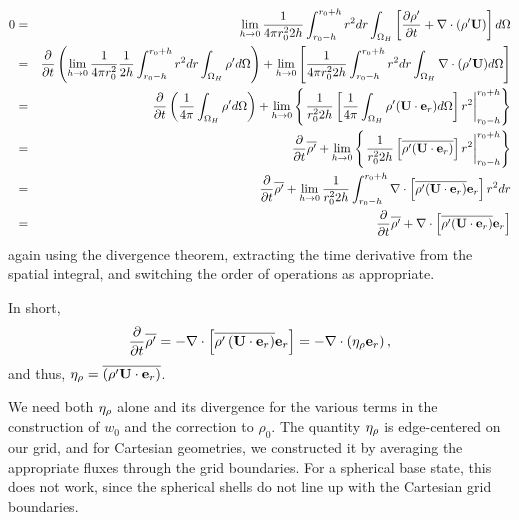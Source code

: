 \begin{eqnarray} 
0 &=& \lim_{h\rightarrow 0} \frac{1}{4\pi r_0^2 2h} \int_{r_0-h}^{r_0+h} r^2  dr \int_{\Omega_H} \left[\frac{\partial \rho'}{\partial t} + \nabla\cdot(\rho'{\bf U})\right] d\Omega \nonumber \\
&=& \frac{\partial}{\partial t} \left( \lim_{h\rightarrow 0} \frac{1}{4\pi r_0^2} \frac{1}{2h} \int_{r_0-h}^{r_0+h} r^2  dr \int_{\Omega_H}  \rho' d\Omega \right) + \lim_{h\rightarrow 0} \left[\frac{1}{4\pi r_0^2  2h} \int_{r_0-h}^{r_0+h} r^2  dr \int_{\Omega_H}  \nabla \cdot ( \rho' {\bf U} )  d\Omega\right] \nonumber \\
&=& \frac{\partial}{\partial t} \left(\frac{1}{4\pi} \int_{\Omega_H}  \rho'  d\Omega \right) + \lim_{h\rightarrow 0} \left\{\left.\frac{1}{r_0^2 2h}\left[\frac{1}{4\pi}\int_{\Omega_H} \rho' ({\bf U} \cdot {\bf e}_r)  d\Omega  \right]  r^2 \right |_{r_0-h}^{r_0+h} \right\} \nonumber  \\
&=&  \frac{\partial}{\partial t} \overline{\rho'} + \lim_{h\rightarrow 0} \left\{ \left .  \frac{1}{r_0^2  2h} \left[ \overline{\rho' ({\bf U} \cdot {\bf e}_r)} \right]  r^2  \right |_{r_0-h}^{r_0+h} \right\} \nonumber  \\
&=&  \frac{\partial}{\partial t} \overline{\rho'} + \lim_{h\rightarrow 0} \frac{1}{r_0^2 2h} \int_{r_0-h}^{r_0+h} \nabla \cdot \left[\overline{\rho' ({\bf U} \cdot {\bf e}_r)} {\bf e}_r \right]  r^2  dr \nonumber \\
&=&  \frac{\partial}{\partial t} \overline{\rho'} + \nabla \cdot \left[ \overline{\rho' ({\bf U} \cdot {\bf e}_r)} {\bf e}_r \right]
\end{eqnarray} 
again using the divergence theorem, extracting the time derivative from the spatial integral,
and switching the order of operations as appropriate.

In short, 
\begin{equation}
\frac{\partial}{\partial t} \overline{\rho'} = - \nabla\cdot\left[\overline{\rho'\left({\bf U}\cdot{\bf e}_r\right)}{\bf e}_r\right] = -\nabla\cdot\left(\eta_{\rho}{\bf e}_r\right),
\end{equation} 
and thus, $\eta_{\rho} = \overline{\left(\rho'{\bf U}\cdot{\bf e}_r\right)}$.

We need both $\eta_{\rho}$ alone and its divergence for the
various terms in the construction of $w_0$ and the correction to
$\rho_0$.  The quantity $\eta_{\rho}$ is edge-centered on our grid, and
for Cartesian geometries, we constructed it by averaging the
appropriate fluxes through the grid boundaries.  For a spherical base
state, this does not work, since the spherical shells do not line up
with the Cartesian grid boundaries.

